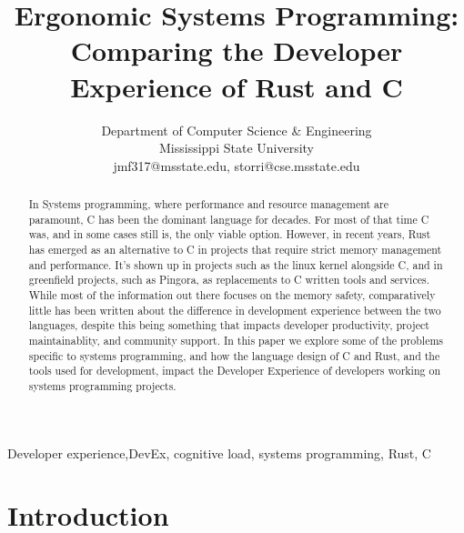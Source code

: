 \documentclass[conference]{IEEEtran}
\begin{document}
\title{Ergonomic Systems Programming: Comparing the Developer Experience of Rust and C}

\author{
    Department of Computer Science \& Engineering\\ Mississippi State University
    \\
    jmf317@msstate.edu, storri@cse.msstate.edu\\
}

\maketitle

\begin{abstract}
    In Systems programming, where performance and resource management are paramount, C has been the dominant language for decades. For most of that time C was, and
    in some cases still is, the only viable option. However, in recent years, Rust has emerged as an alternative to C in projects that require strict memory management and performance.
    It's shown up in projects such as the linux kernel alongside C, and in greenfield projects, such as Pingora, as replacements to C written tools and services. While most of the information out
    there focuses on the memory safety, comparatively little has been written about the difference in development experience between the two languages, despite this being something that impacts
    developer productivity, project maintainablity, and community support. In this paper we explore some of the problems specific to systems programming, and how the language design of C and Rust,
    and the tools used for development, impact the Developer Experience of developers working on systems programming projects.
\end{abstract}

\begin{IEEEkeywords}
    Developer experience,DevEx, cognitive load, systems programming, Rust, C
\end{IEEEkeywords}

\section{Introduction}
\end{document}

